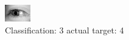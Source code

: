 \begin{figure}[h!]
\begin{center}
\includegraphics[width=0.60\columnwidth]{figures/ID3201_class_3_target_4.png}
\end{center}
\caption{ Classification: 3 actual target: 4}
\label{fig:ID3201_class_3_target_4}
\end{figure}

